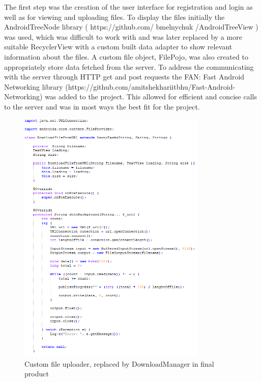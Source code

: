 \documentclass[11pt]{article}
\begin{document}
The first step was the creation of the user interface for registration and login as well as for viewing and uploading files. To display the files initially the AndroidTreeNode library ( https://github.com/ bmelnychuk /AndroidTreeView ) was used, which was difficult to work with and was later replaced by a more suitable RecyclerView with a custom built data adapter to show relevant information about the files. A custom file object, FilePojo, was also created to appropriately store data fetched from the server.
To address the communicating with the server through HTTP get and post requests the FAN: Fast Android Networking library (https://github.com/amitshekhariitbhu/Fast-Android-Networking) was added to the project. This allowed for efficient and concise calls to the server and was in most ways the best fit for the project. 


\begin{figure} [h!]
\caption{Custom file uploader, replaced by DownloadManager in final product}
\centering
\includegraphics[width=0.8\textwidth]{downloadclass.PNG}
\end{figure}
\end{document}
